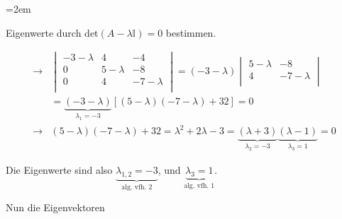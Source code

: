 \begin{solution}    

    \vspace{1\baselineskip}

    \leftskip=2em

    Eigenwerte durch det\( (A - \lambda \mathbb{I}) = 0 \) bestimmen. 

    \begin{equation*}
        \begin{aligned}
            \rightarrow & \begin{vmatrix}
                -3 - \lambda & 4 & -4 \\
                0 & 5 - \lambda & -8 \\
                0 & 4 & -7 - \lambda \\
            \end{vmatrix} = (-3 - \lambda) \begin{vmatrix}
                5 - \lambda & -8 \\
                4 & -7 - \lambda \\
                \end{vmatrix} \\[0.5em]
                &= \underbrace{(-3 - \lambda)}_{\lambda_1 = -3} \left[(5 - \lambda)(-7 - \lambda) + 32\right] = 0 \\[0.5em]
                \rightarrow & (5 - \lambda)(-7 - \lambda) + 32 = \lambda^2 + 2\lambda - 3 = \underbrace{(\lambda +3)}_{\lambda_2 = -3}\underbrace{(\lambda -1)}_{\lambda_3 = 1} = 0 
        \end{aligned}
    \end{equation*}

    Die Eigenwerte sind also \( \underbrace{\lambda_{1,2} = -3}_{\text{alg. vfh. 2}} \), und \( \underbrace{\lambda_3 = 1}_{\text{alg. vfh. 1}} \).

    \vspace{1\baselineskip}

    Nun die Eigenvektoren 

    \vspace{0.5\baselineskip}


\end{solution}
